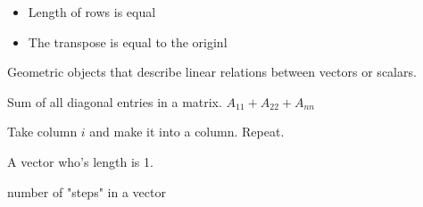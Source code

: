 \begin{definition}[Symmetric]
    \begin{itemize}
        \item Length of rows is equal
        \item The transpose is equal to the originl
    \end{itemize}
\end{definition}

\begin{definition}[Tensor]
    Geometric objects that describe linear relations between vectors or scalars.
\end{definition}

\begin{definition}[Trace]
    Sum of all diagonal entries in a matrix.
    $A_{11} + A_{22} + A_{nn}$
\end{definition}

\begin{definition}[Transpose]
    Take column $i$ and make it into a column. Repeat.
\end{definition}

\begin{definition}
    A vector who's length is 1.
\end{definition}


\begin{definition}
    number of "steps" in a vector
\end{definition}

